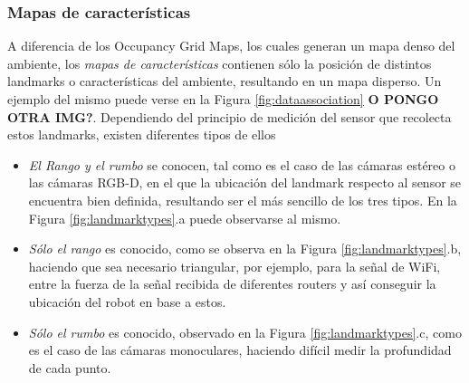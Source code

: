 \subsubsection{Mapas de características}
A diferencia de los Occupancy Grid Maps, los cuales generan un mapa denso del ambiente, los \textit{mapas de características} contienen sólo la posición de distintos landmarks o características del ambiente, resultando en un mapa disperso. Un ejemplo del mismo puede verse en la Figura \ref{fig:dataassociation} \textbf{O PONGO OTRA IMG?}. Dependiendo del principio de medición del sensor que recolecta estos landmarks, existen diferentes tipos de ellos
\begin{itemize}
    \item \textit{El Rango y el rumbo} se conocen, tal como es el caso de las cámaras estéreo o las cámaras RGB-D, en el que la ubicación del landmark respecto al sensor se encuentra bien definida, resultando ser el más sencillo de los tres tipos. En la Figura \ref{fig:landmarktypes}.a puede observarse al mismo.
    \item \textit{Sólo el rango} es conocido, como se observa en la Figura \ref{fig:landmarktypes}.b, haciendo que sea necesario triangular, por ejemplo, para la señal de WiFi, entre la fuerza de la señal recibida de diferentes routers y así conseguir la ubicación del robot en base a estos.
    \item \textit{Sólo el rumbo} es conocido, observado en la Figura \ref{fig:landmarktypes}.c, como es el caso de las cámaras monoculares, haciendo difícil medir la profundidad de cada punto.
\end{itemize}

